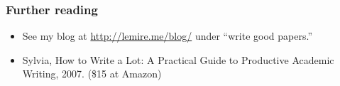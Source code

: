 \documentclass[handout]{beamer}
\begin{document}
\frame
{
  \frametitle{Further reading}

  \begin{itemize}
  \item<1-> See my blog at \url{http://lemire.me/blog/} under ``write good papers.''
    \item<2-> Sylvia, How to Write a Lot: A Practical Guide to Productive Academic Writing, 2007. (\$15 at Amazon)
  \end{itemize}
}


%
%
%
%
%

\end{document}
